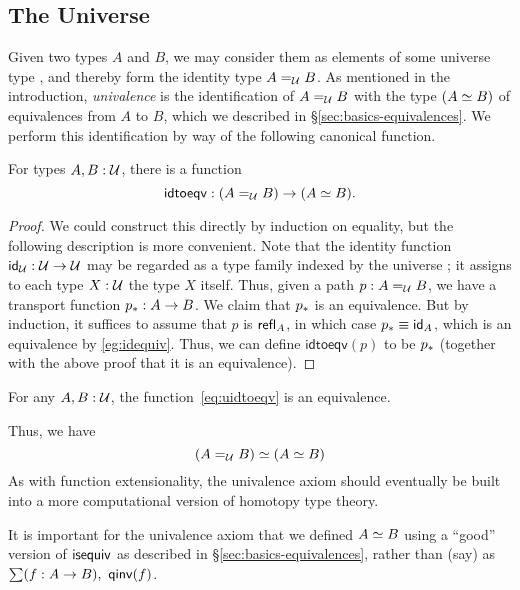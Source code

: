 \subsection{The Universe}
\label{sec:compute-universe}

Given two types $A$ and $B$, we may consider them as elements of some universe type \type, and thereby form the identity type $\id[\type]AB$.
As mentioned in the introduction, \emph{univalence} is the identification of $\id[\type]AB$ with the type $(\eqv AB)$ of equivalences from $A$ to $B$, which we described in \S\ref{sec:basics-equivalences}.
We perform this identification by way of the following canonical function.

\begin{lem}
  For types $A,B:\type$, there is a function
  \begin{equation}\label{eq:uidtoeqv}
    \mathsf{idtoeqv} : (\id[\type]AB) \to (\eqv A B).
  \end{equation}
\end{lem}
\begin{proof}
  We could construct this directly by induction on equality, but the following description is more convenient.
  Note that the identity function $\idfunc[\type]:\type\to\type$ may be regarded as a type family indexed by the universe \type; it assigns to each type $X:\type$ the type $X$ itself.
  Thus, given a path $p:A =_\type B$, we have a transport function $\transf{p}:A \to B$.
  We claim that $\transf{p}$ is an equivalence.
  But by induction, it suffices to assume that $p$ is $\refl A$, in which case $\transf{p} \jdeq \idfunc[A]$, which is an equivalence by \autoref{eg:idequiv}.
  Thus, we can define $\mathsf{idtoeqv}(p)$ to be $\transf{p}$ (together with the above proof that it is an equivalence).
\end{proof}

\begin{axiom}[Univalence]
  For any $A,B:\type$, the function~\eqref{eq:uidtoeqv} is an equivalence.
\end{axiom}

Thus, we have
\[
\eqv{(\id[\type]{A}{B})}{(\eqv A B)}
\]
As with function extensionality, the univalence axiom should eventually be built into a more computational version of homotopy type theory.

\begin{rmk}
  It is important for the univalence axiom that we defined $\eqv AB$ using a ``good'' version of $\isequiv$ as described in \S\ref{sec:basics-equivalences}, rather than (say) as $\sm{f:A\to B} \qinv(f)$.
\end{rmk}

